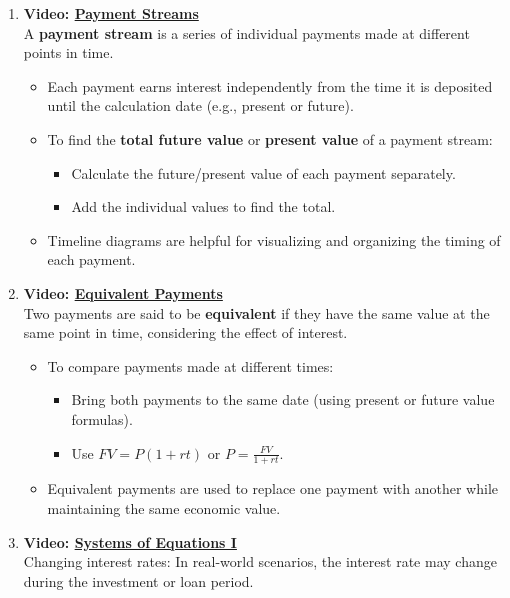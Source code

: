 \documentclass[
]{book}
\providecommand{\tightlist}{%
  \setlength{\itemsep}{0pt}\setlength{\parskip}{0pt}}
\begin{document}
\begin{enumerate}
\def\labelenumi{\arabic{enumi}.}
\tightlist
\item
  \textbf{Video: \href{https://youtu.be/eCy0_cPgobc}{Payment Streams}}\\
  A \textbf{payment stream} is a series of individual payments made at different points in time.

  \begin{itemize}
  \tightlist
  \item
    Each payment earns interest independently from the time it is deposited until the calculation date (e.g., present or future).
  \item
    To find the \textbf{total future value} or \textbf{present value} of a payment stream:

    \begin{itemize}
    \tightlist
    \item
      Calculate the future/present value of each payment separately.
    \item
      Add the individual values to find the total.
    \end{itemize}
  \item
    Timeline diagrams are helpful for visualizing and organizing the timing of each payment.
  \end{itemize}
\item
  \textbf{Video: \href{https://youtu.be/0v4t_Xp7tGo}{Equivalent Payments}}\\
  Two payments are said to be \textbf{equivalent} if they have the same value at the same point in time, considering the effect of interest.

  \begin{itemize}
  \tightlist
  \item
    To compare payments made at different times:

    \begin{itemize}
    \tightlist
    \item
      Bring both payments to the same date (using present or future value formulas).
    \item
      Use \(FV = P(1 + rt)\) or \(P = \frac{FV}{1 + rt}\).
    \end{itemize}
  \item
    Equivalent payments are used to replace one payment with another while maintaining the same economic value.
  \end{itemize}
\item
  \textbf{Video: \href{https://youtu.be/ooUss4RfLHI}{Systems of Equations I}}\\
  Changing interest rates: In real-world scenarios, the interest rate may change during the investment or loan period.


\end{enumerate}
\end{document}
